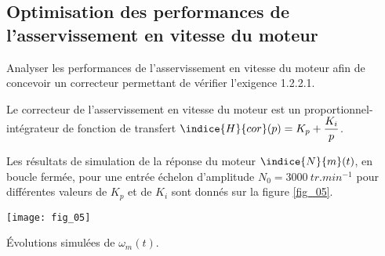 \subsection*{Optimisation des performances de l’asservissement en vitesse du moteur}
\begin{obj}
Analyser les performances de l’asservissement en vitesse du moteur afin de concevoir un
correcteur permettant de vérifier l’exigence 1.2.2.1.
\end{obj}


\ifprof
\else
Le correcteur de l’asservissement en vitesse du moteur est un proportionnel-intégrateur de fonction
de transfert $\indice{H}{cor}(p) = K_p+\dfrac{K_i}{p}$.

Les résultats de simulation de la réponse du moteur $\indice{N}{m}(t)$, en boucle fermée, pour une entrée échelon
d’amplitude $N_0 = \SI{3 000}{tr.min^{-1}}$ pour différentes valeurs de $K_p$ et de $K_i$ sont donnés sur la figure \ref{fig_05}.


\fi

\begin{marginfigure}[-6cm]
\centering
\texttt{[image: fig\_05]}
\caption{Évolutions simulées de $\omega_m(t)$.}
\label{fig_05}
\end{marginfigure}




